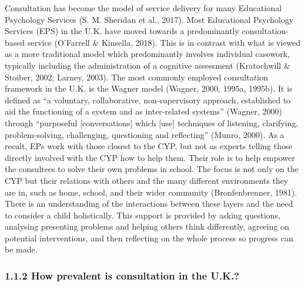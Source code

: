 \documentclass[
  english,
  man]{apa}
\begin{document}
Consultation has become the model of service delivery for many Educational Psychology Services (S. M. Sheridan et al., 2017). Most Educational Psychology Services (EPS) in the U.K. have moved towards a predominantly consultation-based service (O'Farrell \& Kinsella, 2018). This is in contrast with what is viewed as a more traditional model which predominantly involves individual casework, typically including the administration of a cognitive assessment (Kratochwill \& Stoiber, 2002; Larney, 2003). The most commonly employed consultation framework in the U.K. is the Wagner model (Wagner, 2000, 1995a, 1995b). It is defined as ``a voluntary, collaborative, non-supervisory approach, established to aid the functioning of a system and as inter-related systems'' (Wagner, 2000) through ``purposeful {[}conversations{]} which {[}use{]} techniques of listening, clarifying, problem-solving, challenging, questioning and reflecting'' (Munro, 2000). As a result, EPs work with those closest to the CYP, but not as experts telling those directly involved with the CYP how to help them. Their role is to help empower the consultees to solve their own problems in school. The focus is not only on the CYP but their relations with others and the many different environments they are in, such as home, school, and their wider community (Bronfenbrenner, 1981). There is an understanding of the interactions between these layers and the need to consider a child holistically. This support is provided by asking questions, analysing presenting problems and helping others think differently, agreeing on potential interventions, and then reflecting on the whole process so progress can be made.

\hypertarget{how-prevalent-is-consultation-in-the-u.k.}{%
\subsubsection{1.1.2 How prevalent is consultation in the U.K.?}\label{how-prevalent-is-consultation-in-the-u.k.}}
\end{document}
